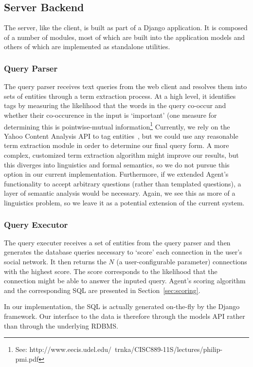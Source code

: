 \subsection{Server Backend}
The server, like the client, is built as part of a Django application. It is
composed of a number of modules, most of which are built into the application
models and others of which are implemented as standalone utilities.

\subsubsection{Query Parser}
\label{sec:query-parser}
The query parser receives text queries from the web client and resolves them
into sets of entities through a term extraction process. At a high level, it
identifies tags by measuring the likelihood that the words in the query co-occur
and whether their co-occurence in the input is `important' (one measure for
determining this is pointwise-mutual information\footnote{See:
http://www.eecis.udel.edu/~trnka/CISC889-11S/lectures/philip-pmi.pdf} Currently,
we rely on the Yahoo Content Analysis API to tag entities~\cite{yahoo_ca}, but
we could use any reasonable term extraction module in order to determine our
final query form. A more complex, customized term extraction algorithm might
improve our results, but this diverges into linguistics and formal semantics, so
we do not pursue this option in our current implementation.  Furthermore, if we
extended Agent's functionality to accept arbitrary questions (rather than
templated questions), a layer of semantic analysis would be necessary. Again, we
see this as more of a linguistics problem, so we leave it as a potential
extension of the current system.

\subsubsection{Query Executor}
The query executer receives a set of entities from the query parser and then
generates the database queries necessary to `score' each connection in the
user's social network.  It then returns the $N$ (a user-configurable parameter)
connections with the highest score.  The score corresponds to the likelihood
that the connection might be able to answer the inputed query. Agent's scoring
algorithm and the corresponding SQL are presented in Section~\ref{sec:scoring}.

In our implementation, the SQL is actually generated on-the-fly by the Django
framework. Our interface to the data is therefore through the models API rather
than through the underlying RDBMS.

